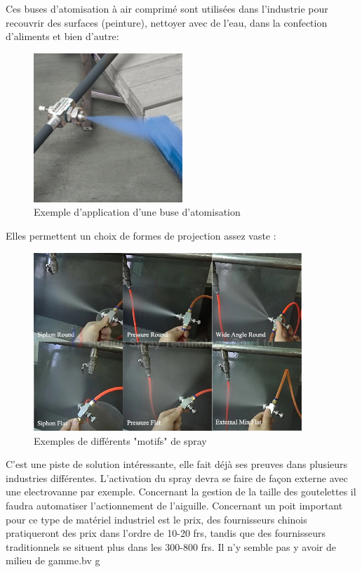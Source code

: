 Ces buses d'atomisation à air comprimé sont utilisées dans l'industrie pour recouvrir des surfaces (peinture), nettoyer avec de l'eau, dans la confection d'aliments et bien d'autre:
\begin{figure}[H]
    \centering
    \includegraphics[width=0.5\textwidth]{assets/figures/etat_art/buse spray.jpeg}
    \caption[Exemple d'application d'une buse d'atomisation]{Exemple d'application d'une buse d'atomisation \autocite{exemple_application_buse}\footnotemark}
\end{figure}
\newpage
Elles permettent un choix de formes de projection assez vaste :
\begin{figure}[H]
    \centering
    \includegraphics[width=0.9\textwidth]{assets/figures/etat_art/spray_patterns_example.jpeg}
    \caption[Exemples de différents "motifs" de spray]{Exemples de différents "motifs" de spray \autocite{Exemples_spray_patterns}\footnotemark}
\end{figure}
C'est une piste de solution intéressante, elle fait déjà ses preuves dans plusieurs industries différentes.
L'activation du spray devra se faire de façon externe avec une electrovanne par exemple. Concernant la gestion de la taille
des goutelettes il faudra automatiser l'actionnement de l'aiguille. Concernant un poit important pour ce type de matériel industriel est le prix,
des fournisseurs chinois pratiqueront des prix dans l'ordre de 10-20 frs, tandis que des fournisseurs traditionnels se situent plus dans les 300-800 frs. Il n'y semble
pas y avoir de milieu de gamme.bv g

